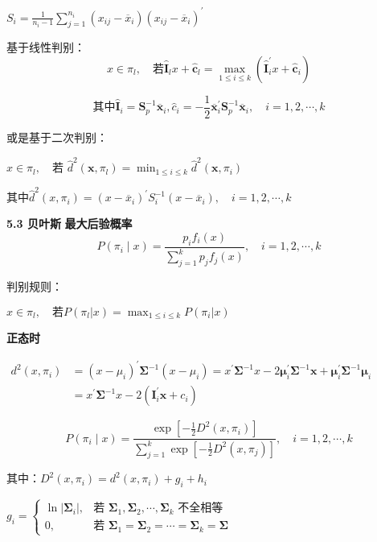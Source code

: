 \documentclass[10pt,a4paper]{ctexart} %
\begin{document}
\begin{multicols*}{3}
		$S_i=\frac{1}{n_i-1}\sum_{j=1}^{n_i}\left(x_{ij}-\overline{x}_i\right)\left(x_{ij}-\overline{x}_i\right)^{\prime}$
		
		基于线性判别：
		$$x{\in}\pi_{l},\quad\text{若}\hat{\boldsymbol{I}}_{l}x+\hat{\boldsymbol{c}}_{l}=\max_{1\leqslant i\leqslant k}(\hat{\boldsymbol{I}}_{i}^{'}x+\hat{\boldsymbol{c}}_{i})$$
		
		$$\text{其中}\hat{\boldsymbol{I}}_i=\boldsymbol{S}_p^{-1}\overline{\boldsymbol{x}}_i,\hat{c}_i=-\frac{1}{2}\overline{\boldsymbol{x}}_i^{\prime}\boldsymbol{S}_p^{-1}\overline{\boldsymbol{x}}_i,\quad i=1,2,\cdots,k$$
		
		或是基于二次判别：
		
		$x{\in}\pi_{l},\quad\text{若 }\hat{d}^{2}\left(\boldsymbol{x},\pi_{l}\right)=\min_{1\leqslant i\leqslant k}\hat{d}^{2}\left(\boldsymbol{x},\pi_{i}\right)$
		
		$\text{其中}\hat{d}^{2}\left(x,\pi_{i}\right)=\left(x-\overline{x}_{i}\right)^{\prime}S_{i}^{-1}\left(x-\overline{x}_{i}\right),\quad i=1,2,\cdots,k$
		
		\textbf{5.3 贝叶斯}
		\textbf{最大后验概率}
		$$P\left(\pi_{i}\mid x\right)=\frac{p_{i}f_{i}\left(x\right)}{\sum_{j=1}^{k}p_{j}f_{j}\left(x\right)},\quad i=1,2,\cdots,k$$
		
		判别规则：
		
		$x{\in}\pi_{l},\quad\text{若}P\left(\pi_{l}|x\right)=\max_{1\leqslant i\leqslant k}P\left(\pi_{i}|x\right)$
		
		\textbf{正态时}
		
		$\begin{aligned}d^{2}\left(x,\pi_{i}\right)&=(x-\mu_i)^{\prime}\boldsymbol{\Sigma}^{-1}(x-\mu_i)=x^{\prime}\boldsymbol{\Sigma}^{-1}x-2\boldsymbol{\mu}_i^{\prime}\boldsymbol{\Sigma}^{-1}\boldsymbol{x}+\boldsymbol{\mu}_i^{\prime}\boldsymbol{\Sigma}^{-1}\boldsymbol{\mu}_i\\&=x^{\prime}\boldsymbol{\Sigma}^{-1}x-2(\boldsymbol{I}_i^{\prime}\boldsymbol{x}+c_i)\end{aligned}$
		
		$$P\left(\pi_{i}\mid x\right)=\frac{\exp\left[-\frac{1}{2}D^{2}\left(x,\pi_{i}\right)\right]}{\sum_{j=1}^{k}\exp\left[-\frac{1}{2}D^{2}\left(x,\pi_{j}\right)\right]},\quad i=1,2,\cdots,k$$
		
		其中：$D^{2}\left(x,\pi_{i}\right)=d^{2}\left(x,\pi_{i}\right)+g_{i}+h_{i}$
		
		$g_i=\begin{cases}\ln|\boldsymbol{\Sigma}_i|,&\text{若 }\boldsymbol{\Sigma}_1,\boldsymbol{\Sigma}_2,\cdots,\boldsymbol{\Sigma}_k\text{ 不全相等}\\0,&\text{若 }\boldsymbol{\Sigma}_1=\boldsymbol{\Sigma}_2=\cdots=\boldsymbol{\Sigma}_k=\boldsymbol{\Sigma}\end{cases}$
		

\end{multicols*}
\end{document}
